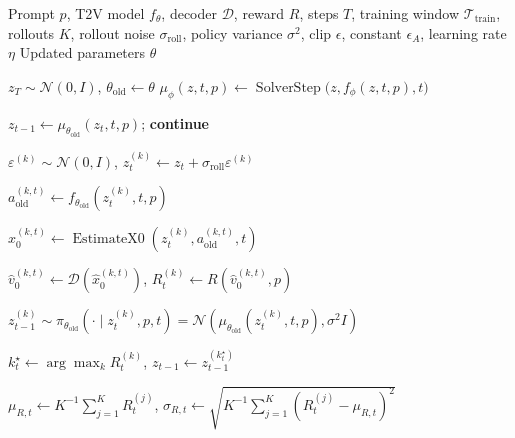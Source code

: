 \documentclass{article}
\begin{document}
\begin{algorithm}[t]
\caption{PhyPO-T2V with Best-of-\(K\) Trajectory Selection}
\label{alg:phypo-t2v}
\footnotesize
\setlength{\algorithmicindent}{1em}
\begin{algorithmic}[1]

\Require Prompt \(p\), T2V model \(f_\theta\), decoder \(\mathcal D\),
reward \(R\), steps \(T\), training window
\(\mathcal T_{\mathrm{train}}\), rollouts \(K\), rollout noise
\(\sigma_{\mathrm{roll}}\), policy variance \(\sigma^2\), clip
\(\epsilon\), constant \(\epsilon_A\), learning rate \(\eta\)
\Ensure Updated parameters \(\theta\)

\State \(z_T\sim\mathcal N(0,I)\), \quad
\(\theta_{\mathrm{old}}\gets\theta\)
\State \(\mu_\phi(z,t,p)\gets
\operatorname{SolverStep}\bigl(z,f_\phi(z,t,p),t\bigr)\)

        \State \(z_{t-1}\gets
        \mu_{\theta_{\mathrm{old}}}(z_t,t,p)\);
        \textbf{continue}
    \EndIf

        \State \(\varepsilon^{(k)}\sim\mathcal N(0,I)\), \quad
        \(z_t^{(k)}
        \gets z_t+\sigma_{\mathrm{roll}}\varepsilon^{(k)}\)

        \State \(a_{\mathrm{old}}^{(k,t)}
        \gets f_{\theta_{\mathrm{old}}}(z_t^{(k)},t,p)\)

        \State \(\hat{x}_0^{(k,t)}
        \gets\operatorname{EstimateX0}
        (z_t^{(k)},a_{\mathrm{old}}^{(k,t)},t)\)

        \State \(\hat v_0^{(k,t)}
        \gets\mathcal D(\hat x_0^{(k,t)})\), \quad
        \(R_t^{(k)}\gets R(\hat v_0^{(k,t)},p)\)

        \State \(z_{t-1}^{(k)}
        \sim\pi_{\theta_{\mathrm{old}}}
        (\cdot\mid z_t^{(k)},p,t)
        =
        \mathcal N\!\left(
        \mu_{\theta_{\mathrm{old}}}(z_t^{(k)},t,p),
        \sigma^2I
        \right)\)
    \EndFor

    \State \(k_t^\star\gets\arg\max_k R_t^{(k)}\), \quad
    \(z_{t-1}\gets z_{t-1}^{(k_t^\star)}\)

    \State \(\mu_{R,t}\gets K^{-1}\sum_{j=1}^K R_t^{(j)}\), \quad
    \(\sigma_{R,t}\gets
    \sqrt{K^{-1}\sum_{j=1}^K
    (R_t^{(j)}-\mu_{R,t})^2}\)


\end{algorithmic}
\end{algorithm}
\end{document}
